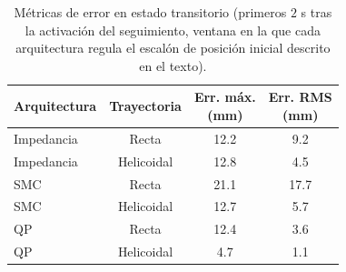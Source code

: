 \begin{table}[H]
	\centering
	\begin{tabular}{l|c|c|c}
        \textbf{Arquitectura} & \textbf{Trayectoria} & \shortstack{\textbf{Err. máx.}        \\\textbf{(mm)}} & \shortstack{\textbf{Err. RMS}\\\textbf{(mm)}} \\
        \hline
        Impedancia            & Recta                & 12.2                           & 9.2  \\
        Impedancia            & Helicoidal           & 12.8                           & 4.5  \\
        SMC                   & Recta                & 21.1                           & 17.7 \\
        SMC                   & Helicoidal           & 12.7                           & 5.7  \\
        QP                    & Recta                & 12.4                           & 3.6  \\
        QP                    & Helicoidal           & 4.7                            & 1.1  \\
    \end{tabular}
	\caption{Métricas de error en estado transitorio (primeros \(2\) s tras la
		activación del seguimiento, ventana en la que cada arquitectura
		regula el escalón de posición inicial descrito en el texto).}
	\label{tab:transitorio_arquitecturas}
\end{table}

